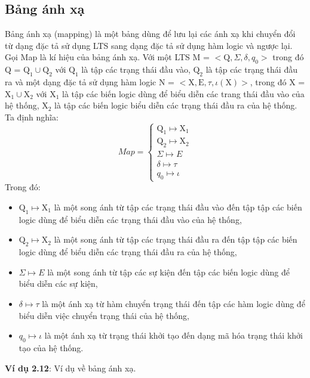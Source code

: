 \documentclass[a4paper,13pt,oneside,openany]{book}
\begin{document}
\begin{flushleft}
		\section{Bảng ánh xạ}
		Bảng ánh xạ (mapping) là một bảng dùng để lưu lại các ánh xạ khi chuyển đổi từ dạng đặc tả sử dụng LTS sang dạng đặc tả sử dụng hàm logic và ngược lại.\\
		Gọi Map là kí hiệu của bảng ánh xạ. Với một LTS M = $<\textrm{Q}, \Sigma, \delta, q_{0}>$ trong đó Q = $\textrm{Q}_1 \cup \textrm{Q}_2$ với $\textrm{Q}_1$ là tập các trạng thái đầu vào, $\textrm{Q}_2$ là tập các trạng thái đầu ra và một dạng đặc tả sử dụng hàm logic N = $<\textrm{X}, \textrm{E}, \tau, \iota(\textrm{X})>$, trong đó X = $\textrm{X}_1 \cup \textrm{X}_2$ với $\textrm{X}_1$ là tập các biến logic dùng để biểu diễn các trang thái đầu vào của hệ thống, $\textrm{X}_2$ là tập các biến logic biểu diễn các trạng thái đầu ra của hệ thống. Ta định nghĩa:\\
		\[Map = \left\{
		\begin{array}{lr}
			\textrm{Q}_1 \mapsto \textrm{X}_1\\
			\textrm{Q}_2 \mapsto \textrm{X}_2\\
			\Sigma \mapsto E\\
			\delta \mapsto \tau\\
			q_0 \mapsto \iota
		\end{array}
		\right.
		\]
		Trong đó:\\
		\begin{itemize}
			\item $\textrm{Q}_1 \mapsto \textrm{X}_1$ là một song ánh từ tập các trạng thái đầu vào đến tập tập các biến logic dùng để biểu diễn các trạng thái đầu vào của hệ thống,
			\item $\textrm{Q}_2 \mapsto \textrm{X}_2$ là một song ánh từ tập các trạng thái đầu ra đến tập tập các biến logic dùng để biểu diễn các trạng thái đầu ra của hệ thống,
			\item $\Sigma \mapsto E$ là một song ánh từ tập các sự kiện đến tập các biến logic dùng để biểu diễn các sự kiện,
			\item $\delta \mapsto \tau$ là một ánh xạ từ hàm chuyển trạng thái đến tập các hàm logic dùng để biểu diễn việc chuyển trạng thái của hệ thống,
			\item $q_0 \mapsto \iota$ là một ánh xạ từ trạng thái khởi tạo đến dạng mã hóa trạng thái khởi tạo của hệ thống.
		\end{itemize}
		\textbf{Ví dụ 2.12}: Ví dụ về bảng ánh xạ.\\

\end{flushleft}
\end{document}
